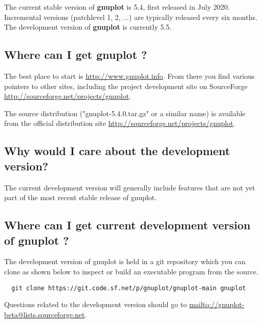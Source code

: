 \documentclass[letter,11pt]{article}
\def\http#1{{\small\href{http://#1}{\url{http://#1}}}}
\def\mailto#1{{\small\href{mailto://#1}{\url{mailto://#1}}}}
\newcommand{\mailto}[1]%
            {\htmladdnormallink{\latex{\url{<#1>}}\html{\textit{#1}}}%
                {mailto:#1}%
            }
\newcommand{\http}[1]%
            {\htmladdnormallink{\latex{\url{http://#1}}%
                    \html{\textit{http://#1}}}%
                {http://#1}%
            }
\newcommand{\gnuplot}{\textbf{gnuplot }}
\begin{document}
{The current stable version of \gnuplot is 5.4, first released in July 2020.
Incremental versions (patchlevel 1, 2, ...) are typically released every six months.
The development version of \gnuplot is currently 5.5.

\subsection{Where can I get \gnuplot?}
\label{where-get-gnuplot}

The best place to start is \http{www.gnuplot.info}. From there
you find various pointers to other sites, including the project
development site on SourceForge \http{sourceforge.net/projects/gnuplot}.

The source distribution ("gnuplot-5.4.0.tar.gz" or a similar name) is
available from the official distribution site \http{sourceforge.net/projects/gnuplot}.

\subsection{Why would I care about the development version?}

The current development version will generally include features that are
not yet part of the most recent stable release of gnuplot.

\subsection{Where can I get current development version of \gnuplot?}

The development version of gnuplot is held in a git repository which you
can clone as shown below to inspect or build an executable program
from the source.

\scriptsize
\begin{verbatim}
  git clone https://git.code.sf.net/p/gnuplot/gnuplot-main gnuplot
\end{verbatim}
\normalsize

Questions related to the development version should go to
\mailto{gnuplot-beta@lists.sourceforge.net}.


}
\end{document}
